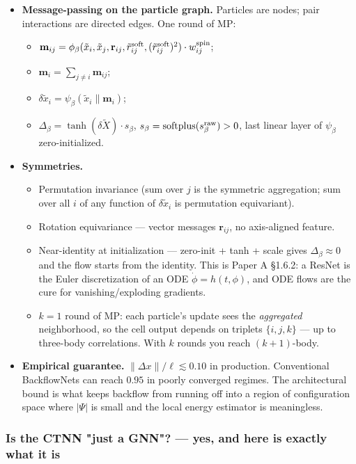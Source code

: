 \documentclass[11pt]{article}
\begin{document}
\begin{itemize}
\item \textbf{Message-passing on the particle graph.} Particles are nodes;
pair interactions are directed edges. One round of MP:
\begin{itemize}
\item $\mathbf m_{ij} = \phi_\beta(\tilde x_i, \tilde x_j, \mathbf r_{ij},
    \tilde r^{\rm soft}_{ij}, (\tilde r^{\rm soft}_{ij})^2) \cdot w^{\rm
    spin}_{ij}$;
\item $\mathbf m_i = \sum_{j \ne i} \mathbf m_{ij}$;
\item $\delta\tilde x_i = \psi_\beta(\tilde x_i \| \mathbf m_i)$;
\item $\Delta_\beta = \tanh(\delta\tilde X) \cdot s_\beta$,
$s_\beta = \mathrm{softplus}(s^{\rm raw}_\beta) > 0$, last linear layer
of $\psi_\beta$ zero-initialized.
\end{itemize}
\item \textbf{Symmetries.}
\begin{itemize}
\item Permutation invariance (sum over $j$ is the symmetric aggregation; sum
over all $i$ of any function of $\delta\tilde x_i$ is permutation
equivariant).
\item Rotation equivariance --- vector messages $\mathbf r_{ij}$, no axis-aligned
feature.
\item Near-identity at initialization --- zero-init + tanh + scale gives
$\Delta_\beta \approx 0$ and the flow starts from the identity. This is
Paper A \S{}1.6.2: a ResNet is the Euler discretization of an ODE
$\dot \phi = h(t, \phi)$, and ODE flows are the cure for
vanishing/exploding gradients.
\item $k = 1$ round of MP: each particle's update sees the \emph{aggregated}
neighborhood, so the cell output depends on triplets $\{i, j, k\}$ --- up
to three-body correlations. With $k$ rounds you reach $(k+1)$-body.
\end{itemize}
\item \textbf{Empirical guarantee.} $\|\Delta x\|/\ell \lesssim 0.10$ in production.
Conventional BackflowNets can reach $0.95$ in poorly converged regimes.
The architectural bound is what keeps backflow from running off into a
region of configuration space where $|\Psi|$ is small and the local
energy estimator is meaningless.
\end{itemize}
\subsubsection*{Is the CTNN "just a GNN"? --- yes, and here is exactly what it is}
\end{document}
